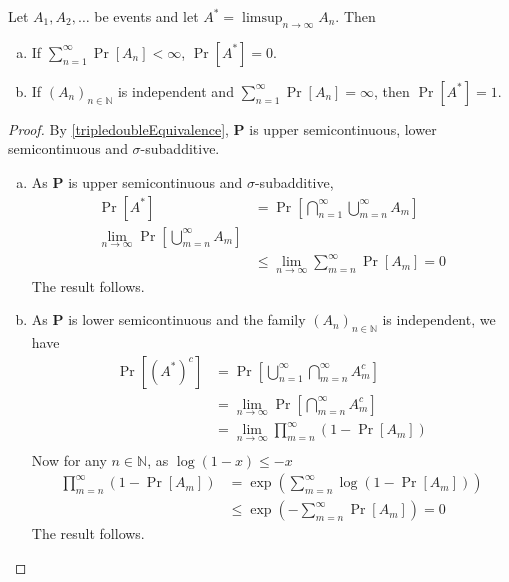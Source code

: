 \begin{ftheo}
\label{borelCantelliLemma}
    Let $A_1,A_2,\ldots$ be events and let $A^*=\limsup_{n\to\infty} A_n$. Then
    \begin{enumerate}[(a)]
        \item If $\sum_{n=1}^\infty \Pr[A_n]<\infty$, $\Pr[A^*]=0$.
        \item If $(A_n)_{n\in\mathbb{N}}$ is independent and $\sum_{n=1}^\infty \Pr[A_n]=\infty$, then $\Pr[A^*]=1$.
    \end{enumerate}
\end{ftheo}
\begin{proof}
    By \cref{tripledoubleEquivalence}, $\textbf{P}$ is upper semicontinuous, lower semicontinuous and $\sigma$-subadditive.
    \begin{enumerate}[(a)]
        \item As $\textbf{P}$ is upper semicontinuous and $\sigma$-subadditive,
        \begin{align*}
            \Pr[A^*] &= \Pr\left[\bigcap_{n=1}^\infty\bigcup_{m=n}^\infty A_m\right] \\
            \lim_{n\to\infty}\Pr\left[\bigcup_{m=n}^\infty A_m\right] \\
            &\leq \lim_{n\to\infty} \sum_{m=n}^\infty \Pr[A_m] = 0
        \end{align*}
        The result follows.
        
        \item As $\textbf{P}$ is lower semicontinuous and the family $(A_n)_{n\in\mathbb{N}}$ is independent, we have
        \begin{align*}
            \Pr[(A^*)^c] &= \Pr\left[\bigcup_{n=1}^\infty\bigcap_{m=n}^\infty A_m^c\right] \\
            &= \lim_{n\to\infty} \Pr\left[\bigcap_{m=n}^\infty A_m^c\right] \\
            &= \lim_{n\to\infty} \prod_{m=n}^\infty \left(1-\Pr[A_m]\right) \\
        \end{align*}
        Now for any $n\in\mathbb{N}$, as $\log(1-x)\leq -x$
        \begin{align*}
            \prod_{m=n}^\infty \left(1-\Pr[A_m]\right)&= \exp\left(\sum_{m=n}^\infty \log(1-\Pr[A_m])\right) \\
            &\leq \exp\left(-\sum_{m=n}^\infty \Pr[A_m]\right) = 0
        \end{align*}
        The result follows.
    \end{enumerate}
\end{proof}

